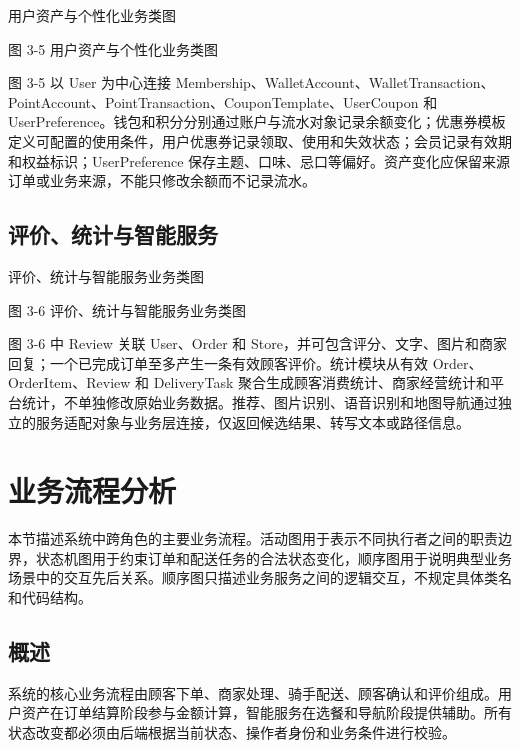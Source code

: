 用户资产与个性化业务类图

\begin{center}
\end{center}

图 3-5  用户资产与个性化业务类图

图 3-5 以 User 为中心连接 Membership、WalletAccount、WalletTransaction、PointAccount、PointTransaction、CouponTemplate、UserCoupon 和 UserPreference。钱包和积分分别通过账户与流水对象记录余额变化；优惠券模板定义可配置的使用条件，用户优惠券记录领取、使用和失效状态；会员记录有效期和权益标识；UserPreference 保存主题、口味、忌口等偏好。资产变化应保留来源订单或业务来源，不能只修改余额而不记录流水。

\subsection{评价、统计与智能服务}

评价、统计与智能服务业务类图

\begin{center}
\end{center}

图 3-6  评价、统计与智能服务业务类图

图 3-6 中 Review 关联 User、Order 和 Store，并可包含评分、文字、图片和商家回复；一个已完成订单至多产生一条有效顾客评价。统计模块从有效 Order、OrderItem、Review 和 DeliveryTask 聚合生成顾客消费统计、商家经营统计和平台统计，不单独修改原始业务数据。推荐、图片识别、语音识别和地图导航通过独立的服务适配对象与业务层连接，仅返回候选结果、转写文本或路径信息。

\section{业务流程分析}

本节描述系统中跨角色的主要业务流程。活动图用于表示不同执行者之间的职责边界，状态机图用于约束订单和配送任务的合法状态变化，顺序图用于说明典型业务场景中的交互先后关系。顺序图只描述业务服务之间的逻辑交互，不规定具体类名和代码结构。

\subsection{概述}

系统的核心业务流程由顾客下单、商家处理、骑手配送、顾客确认和评价组成。用户资产在订单结算阶段参与金额计算，智能服务在选餐和导航阶段提供辅助。所有状态改变都必须由后端根据当前状态、操作者身份和业务条件进行校验。

